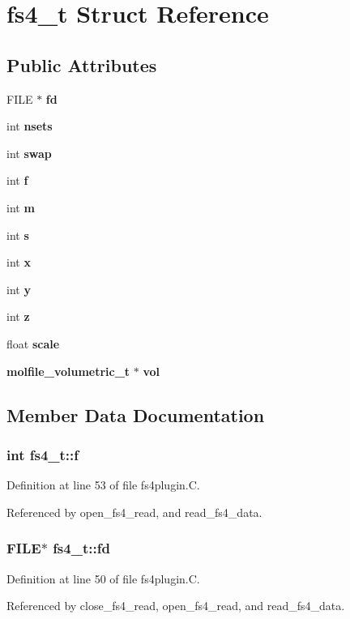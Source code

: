 \section{fs4\_\-t  Struct Reference}
\label{structfs4__t}
\subsection*{Public Attributes}
\begin{CompactItemize}
\item 
FILE $\ast$ {\bf fd}
\item 
int {\bf nsets}
\item 
int {\bf swap}
\item 
int {\bf f}
\item 
int {\bf m}
\item 
int {\bf s}
\item 
int {\bf x}
\item 
int {\bf y}
\item 
int {\bf z}
\item 
float {\bf scale}
\item 
{\bf molfile\_\-volumetric\_\-t} $\ast$ {\bf vol}
\end{CompactItemize}


\subsection{Member Data Documentation}
\subsubsection{\setlength{\rightskip}{0pt plus 5cm}int fs4\_\-t::f}\label{structfs4__t_m3}




Definition at line 53 of file fs4plugin.C.

Referenced by open\_\-fs4\_\-read, and read\_\-fs4\_\-data.
\subsubsection{\setlength{\rightskip}{0pt plus 5cm}FILE$\ast$ fs4\_\-t::fd}\label{structfs4__t_m0}




Definition at line 50 of file fs4plugin.C.

Referenced by close\_\-fs4\_\-read, open\_\-fs4\_\-read, and read\_\-fs4\_\-data.
